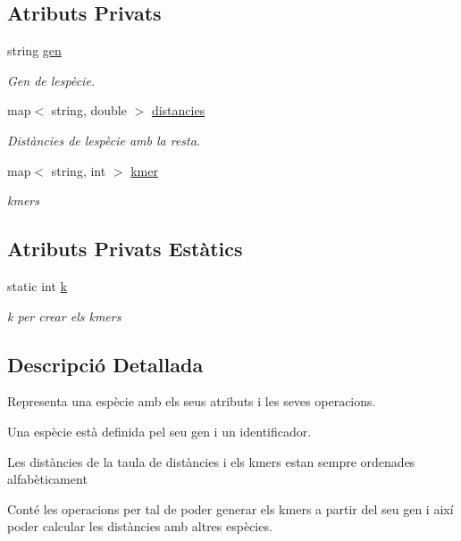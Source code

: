 \subsection*{Atributs Privats}
\begin{DoxyCompactItemize}
\item 
string \hyperlink{class_especie_ac35bb565f7346cd6317b3a8c849456d1}{gen}
\begin{DoxyCompactList}\small\item\em Gen de l\textquotesingle{}espècie. \end{DoxyCompactList}\item 
map$<$ string, double $>$ \hyperlink{class_especie_ad4bbf9359ebc17c3c7f501bc31c86509}{distancies}
\begin{DoxyCompactList}\small\item\em Distàncies de l\textquotesingle{}espècie amb la resta. \end{DoxyCompactList}\item 
map$<$ string, int $>$ \hyperlink{class_especie_ab6740db160f2d7335a98fa8d9f745cbe}{kmer}
\begin{DoxyCompactList}\small\item\em kmers \end{DoxyCompactList}\end{DoxyCompactItemize}
\subsection*{Atributs Privats Estàtics}
\begin{DoxyCompactItemize}
\item 
static int \hyperlink{class_especie_a592c0ddeeebc786969f3040fbefea9df}{k}
\begin{DoxyCompactList}\small\item\em k per crear els kmers \end{DoxyCompactList}\end{DoxyCompactItemize}


\subsection{Descripció Detallada}
Representa una espècie amb els seus atributs i les seves operacions. 

Una espècie està definida pel seu gen i un identificador.

Les distàncies de la taula de distàncies i els kmers estan sempre ordenades alfabèticament

Conté les operacions per tal de poder generar els kmers a partir del seu gen i així poder calcular les distàncies amb altres espècies. 

